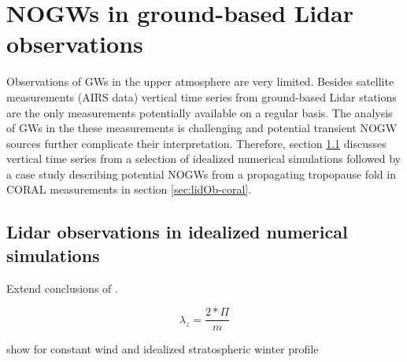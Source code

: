\section{NOGWs in ground-based Lidar observations}

Observations of GWs in the upper atmosphere are very limited. Besides satellite measurements (AIRS data) vertical time series from ground-based Lidar stations are the only measurements potentially available on a regular basis. The analysis of GWs in the these measurements is challenging and potential transient NOGW sources further complicate their interpretation. Therefore, section \ref{sec:lidOb-idealized} discusses vertical time series from a selection of idealized numerical simulations followed by a case study describing potential NOGWs from a propagating tropopause fold in CORAL measurements in section \ref{sec:lidOb-coral}.
 
\subsection{Lidar observations in idealized numerical simulations}
\label{sec:lidOb-idealized}

Extend conclusions of \textcite{dornbrack_interpretation_2017}.



\begin{equation}
    \lambda_z = \frac{2*\Pi}{m} 
    \label{equ:lambdaz}
\end{equation}






show for constant wind and idealized stratospheric winter profile

